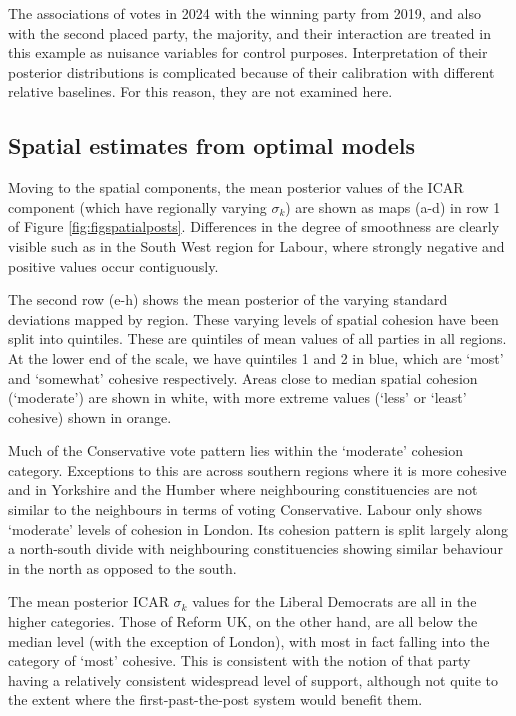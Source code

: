 \documentclass[webpdf,large,contemporary,namedate]{oup-authoring-template}
\theoremstyle{thmstyleone}
\theoremstyle{thmstyletwo}
\theoremstyle{thmstylethree}
\begin{document}
The associations of votes in 2024 with the winning party from 2019, and
also with the second placed party, the majority, and their interaction
are treated in this example as nuisance variables for control purposes.
Interpretation of their posterior distributions is complicated because
of their calibration with different relative baselines. For this reason,
they are not examined here.

\subsection{Spatial estimates from optimal
models}\label{spatial-estimates-from-optimal-models}

Moving to the spatial components, the mean posterior values of the ICAR
component (which have regionally varying \(\sigma_k\)) are shown as maps
(a-d) in row 1 of Figure \ref{fig:figspatialposts}. Differences in the
degree of smoothness are clearly visible such as in the South West
region for Labour, where strongly negative and positive values occur
contiguously.

The second row (e-h) shows the mean posterior of the varying standard
deviations mapped by region. These varying levels of spatial cohesion
have been split into quintiles. These are quintiles of mean values of
all parties in all regions. At the lower end of the scale, we have
quintiles 1 and 2 in blue, which are `most' and `somewhat' cohesive
respectively. Areas close to median spatial cohesion (`moderate') are
shown in white, with more extreme values (`less' or `least' cohesive)
shown in orange.

Much of the Conservative vote pattern lies within the `moderate'
cohesion category. Exceptions to this are across southern regions where
it is more cohesive and in Yorkshire and the Humber where neighbouring
constituencies are not similar to the neighbours in terms of voting
Conservative. Labour only shows `moderate' levels of cohesion in London.
Its cohesion pattern is split largely along a north-south divide with
neighbouring constituencies showing similar behaviour in the north as
opposed to the south.

The mean posterior ICAR \(\sigma_k\) values for the Liberal Democrats
are all in the higher categories. Those of Reform UK, on the other hand,
are all below the median level (with the exception of London), with most
in fact falling into the category of `most' cohesive. This is consistent
with the notion of that party having a relatively consistent widespread
level of support, although not quite to the extent where the
first-past-the-post system would benefit them.
\end{document}
